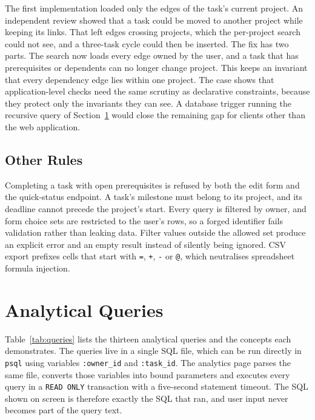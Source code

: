 \documentclass[conference]{IEEEtran}
\begin{document}
The first implementation loaded only the edges of the task's current project.
An independent review showed that a task could be moved to another project
while keeping its links. That left edges crossing projects, which the
per-project search could not see, and a three-task cycle could then be
inserted. The fix has two parts. The search now loads every edge owned by the
user, and a task that has prerequisites or dependents can no longer change
project. This keeps an invariant that every dependency edge lies within one
project. The case shows that application-level checks need the same scrutiny
as declarative constraints, because they protect only the invariants they can
see. A database trigger running the recursive query of Section~\ref{sec:queries}
would close the remaining gap for clients other than the web application.

\subsection{Other Rules}

Completing a task with open prerequisites is refused by both the edit form and
the quick-status endpoint. A task's milestone must belong to its project, and
its deadline cannot precede the project's start. Every query is filtered by
owner, and form choice sets are restricted to the user's rows, so a forged
identifier fails validation rather than leaking data. Filter values outside the
allowed set produce an explicit error and an empty result instead of silently
being ignored. CSV export prefixes cells that start with \texttt{=}, \texttt{+},
\texttt{-} or \texttt{@}, which neutralises spreadsheet formula injection.

\section{Analytical Queries}
\label{sec:queries}

Table~\ref{tab:queries} lists the thirteen analytical queries and the concepts
each demonstrates. The queries live in a single SQL file, which can be run
directly in \texttt{psql} using variables \texttt{:owner\_id} and
\texttt{:task\_id}. The analytics page parses the same file, converts those
variables into bound parameters and executes every query in a
\texttt{READ ONLY} transaction with a five-second statement timeout. The SQL
shown on screen is therefore exactly the SQL that ran, and user input never
becomes part of the query text.
\end{document}
